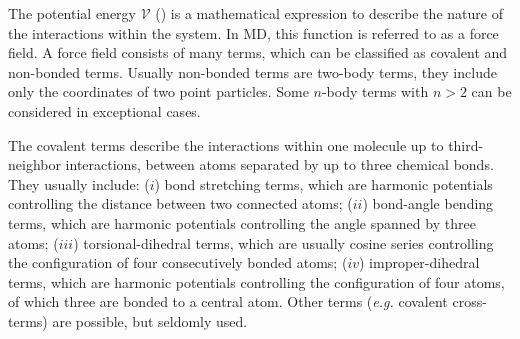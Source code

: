 The potential energy $\mathcal{V}$ ()
is a mathematical expression to describe the nature of the interactions within the system.
In MD, this function is referred to as a force field.
A force field consists of many terms, which can be classified as
covalent and non-bonded terms.\cite{OO04.1} Usually non-bonded terms are two-body
terms, \ie{} they include only the coordinates of two point particles.
Some $n$-body terms with $n>2$ can be considered in exceptional cases.

The covalent terms describe the interactions within one
molecule up to third-neighbor interactions, \ie{} between
atoms separated by up to three chemical bonds. They usually include:
%
($i$) bond stretching terms, which are harmonic potentials controlling the distance
between two connected atoms;
($ii$) bond-angle bending terms, which are harmonic potentials controlling the angle
spanned by three atoms;
($iii$) torsional-dihedral terms, which are usually cosine series controlling
the configuration of four consecutively bonded atoms;
($iv$) improper-dihedral terms, which are harmonic potentials controlling
the configuration of four atoms, of which three are bonded to a central atom.
Other terms ({\em e.g.} covalent cross-terms) are possible, but seldomly used.


